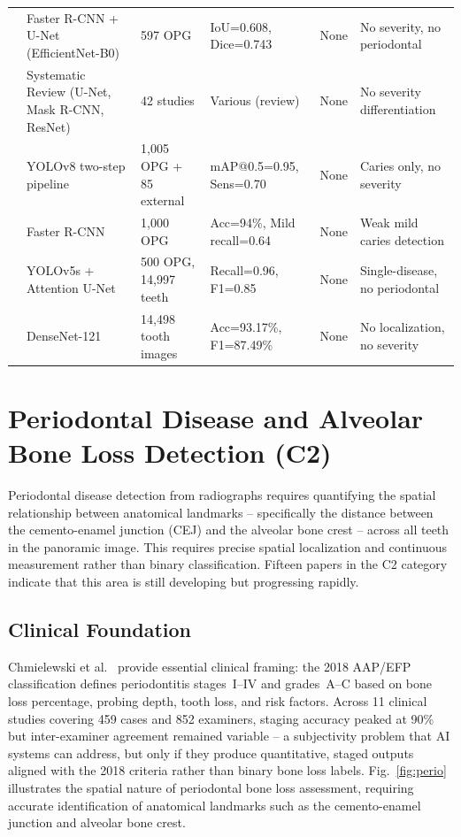 \documentclass[conference]{IEEEtran}
\begin{document}
\begin{table}[t]
\begin{tabular}{p{0.6cm} p{4.8cm} p{3.0cm} p{3.5cm} p{1.0cm} p{3.2cm}}
\cite{lim2024dual}          & Faster R-CNN + U-Net (EfficientNet-B0) & 597 OPG & IoU=0.608, Dice=0.743 & None & No severity, no periodontal \\
\cite{zanini2024systematic} & Systematic Review (U-Net, Mask R-CNN, ResNet) & 42 studies & Various (review) & None & No severity differentiation \\
\cite{bizjak2024advancing}  & YOLOv8 two-step pipeline & 1,005 OPG + 85 external & mAP@0.5=0.95, Sens=0.70 & None & Caries only, no severity \\
\cite{asadi2024detection}   & Faster R-CNN & 1,000 OPG & Acc=94\%, Mild recall=0.64 & None & Weak mild caries detection \\
\cite{pornprasertsuk2025clinical} & YOLOv5s + Attention U-Net & 500 OPG, 14,997 teeth & Recall=0.96, F1=0.85 & None & Single-disease, no periodontal \\
\cite{ozdemir2026enhanced}  & DenseNet-121 & 14,498 tooth images & Acc=93.17\%, F1=87.49\% & None & No localization, no severity \\
\bottomrule
\end{tabular}
\end{table}

\section{Periodontal Disease and Alveolar Bone Loss Detection (C2)}
\label{sec:perio}

Periodontal disease detection from radiographs requires quantifying the
spatial relationship between anatomical landmarks -- specifically the
distance between the cemento-enamel junction (CEJ) and the alveolar
bone crest -- across all teeth in the panoramic image. This requires precise spatial localization and continuous measurement rather than binary classification. Fifteen papers in the C2 category indicate that this area is still developing but progressing rapidly.

\subsection{Clinical Foundation}

Chmielewski et al.~\cite{chmielewski20252018} provide essential clinical
framing: the 2018 AAP/EFP classification defines periodontitis
stages~I--IV and grades~A--C based on bone loss percentage, probing
depth, tooth loss, and risk factors. Across 11 clinical studies covering
459 cases and 852 examiners, staging accuracy peaked at 90\% but
inter-examiner agreement remained variable -- a subjectivity problem
that AI systems can address, but only if they produce quantitative,
staged outputs aligned with the 2018 criteria rather than binary bone
loss labels. Fig.~\ref{fig:perio} illustrates the spatial nature of periodontal bone loss assessment, requiring accurate identification of anatomical landmarks such as the cemento-enamel junction and alveolar bone crest.
\end{document}
